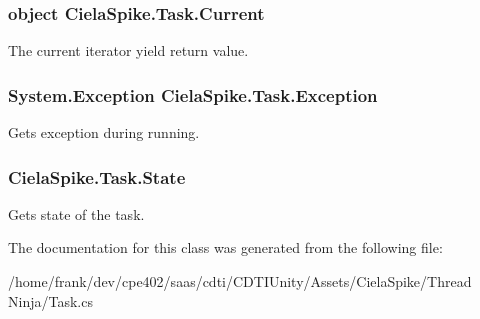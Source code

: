 \subsubsection[{Current}]{\setlength{\rightskip}{0pt plus 5cm}object Ciela\+Spike.\+Task.\+Current\hspace{0.3cm}{\ttfamily [get]}}\label{class_ciela_spike_1_1_task_a1b998f7aa927571627df0e146693c5a4}


The current iterator yield return value. 

\hypertarget{class_ciela_spike_1_1_task_a16f755d6c2d90b3d528aebc7526a0a2b}{}
\subsubsection[{Exception}]{\setlength{\rightskip}{0pt plus 5cm}System.\+Exception Ciela\+Spike.\+Task.\+Exception\hspace{0.3cm}{\ttfamily [get]}}\label{class_ciela_spike_1_1_task_a16f755d6c2d90b3d528aebc7526a0a2b}


Gets exception during running. 

\hypertarget{class_ciela_spike_1_1_task_a0b9fb190966ab28515afb40541ba23cf}{}
\subsubsection[{State}]{ Ciela\+Spike.\+Task.\+State\hspace{0.3cm}{\ttfamily [get]}}\label{class_ciela_spike_1_1_task_a0b9fb190966ab28515afb40541ba23cf}


Gets state of the task. 



The documentation for this class was generated from the following file\+:\begin{DoxyCompactItemize}
\item 
/home/frank/dev/cpe402/saas/cdti/\+C\+D\+T\+I\+Unity/\+Assets/\+Ciela\+Spike/\+Thread Ninja/Task.\+cs\end{DoxyCompactItemize}
